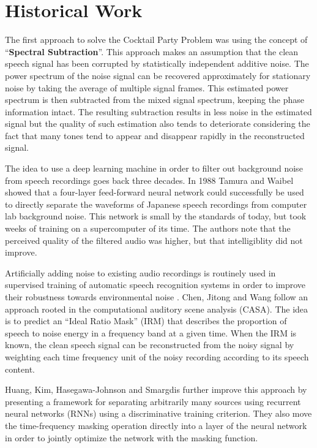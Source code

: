 \section{Historical Work}
The first approach to solve the Cocktail Party Problem was using the concept of \enquote{\textbf{Spectral Subtraction}}\cite{ref:spec_sub}. This approach makes an assumption that the clean speech signal has been corrupted by statistically independent additive noise. The power spectrum of the noise signal can be recovered approximately for stationary noise by taking the average of multiple signal frames. This estimated power spectrum is then subtracted from the mixed signal spectrum, keeping the phase information intact. The resulting subtraction results in less noise in the estimated signal but the quality of such estimation also tends to deteriorate considering the fact that many tones tend to appear and disappear rapidly in the reconstructed signal.\par
The idea to use a deep learning machine in order to filter out background noise from speech recordings goes back three decades. In 1988 Tamura and Waibel \cite{ref:shin} showed that a four-layer feed-forward neural network could successfully be used to directly separate the waveforms of Japanese speech recordings from computer lab background noise. This network is small by the standards of today, but took weeks of training on a supercomputer of its time. The authors note that the perceived quality of the filtered audio was higher, but that intelligiblity did not improve.\par 
Artificially adding noise to existing audio recordings is routinely used in supervised training of automatic speech recognition systems in order to improve their robustness towards environmental noise \cite{ref:awni}. Chen, Jitong and Wang \cite{ref:tong} follow an approach rooted in the computational auditory scene analysis (CASA). The idea is to predict an “Ideal Ratio Mask” (IRM) that describes the proportion of speech to noise energy in a frequency band at a given time. When the IRM is known, the clean speech signal can be reconstructed from the noisy signal by weighting each time frequency unit of the noisy recording according to its speech content.\par
Huang, Kim, Hasegawa-Johnson and Smargdis further improve this approach by presenting a framework for separating arbitrarily many sources using recurrent neural networks (RNNs) using a discriminative training criterion\cite{ref:rnn}. They also move the time-frequency masking operation directly into a layer of the neural network in order to jointly optimize the network with the masking function.
\par


